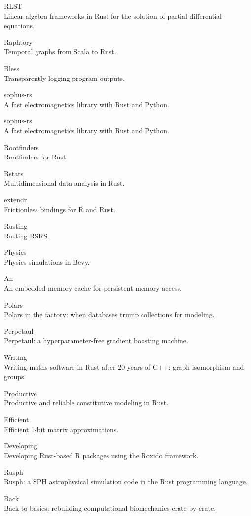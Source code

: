 \documentclass{article}
\begin{document}
RLST\\
Linear algebra frameworks in Rust for the solution of partial differential equations.

Raphtory\\
Temporal graphs from Scala to Rust.

Bless\\
Transparently logging program outputs.

sophus-rs\\
A fast electromagnetics library with Rust and Python.

sophus-rs\\
A fast electromagnetics library with Rust and Python.

Rootfinders\\
Rootfinders for Rust.

Rstats\\
Multidimensional data analysis in Rust.

extendr\\
Frictionless bindings for R and Rust.

Rusting\\
Rusting RSRS.

Physics\\
Physics simulations in Bevy.

An\\
An embedded memory cache for persistent memory access.

Polars\\
Polars in the factory: when databases trump collections for modeling.

Perpetaul\\
Perpetaul: a hyperparameter-free gradient boosting machine.

Writing\\
Writing maths software in Rust after 20 years of C++: graph isomorphism and groups.

Productive\\
Productive and reliable constitutive modeling in Rust.

Efficient\\
Efficient 1-bit matrix approximations.

Developing\\
Developing Rust-based R packages using the Roxido framework.

Rusph\\
Rusph: a SPH astrophysical simulation code in the Rust programming language.

Back\\
Back to basics: rebuilding computational biomechanics crate by crate.
\end{document}
